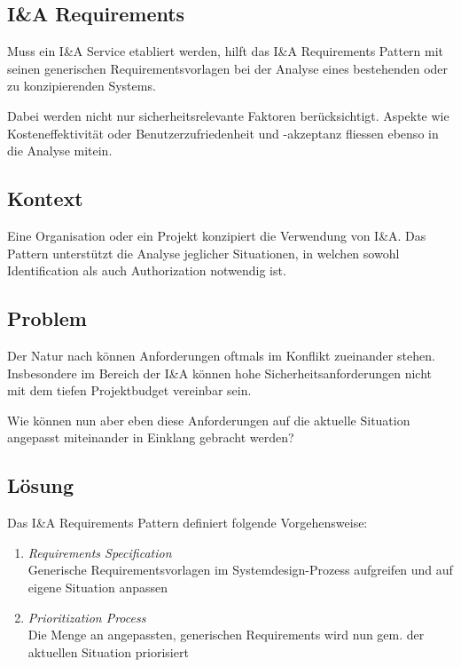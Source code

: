 \subsection{I\&A Requirements}
\label{sec:ianda-requriements}

Muss ein I\&A Service etabliert werden, hilft das I\&A Requirements Pattern mit seinen generischen Requirementsvorlagen bei der Analyse eines bestehenden oder zu konzipierenden Systems.

Dabei werden nicht nur sicherheitsrelevante Faktoren berücksichtigt. Aspekte wie Kosteneffektivität oder Benutzerzufriedenheit und -akzeptanz fliessen ebenso in die Analyse mitein.

\subsection*{Kontext}
Eine Organisation oder ein Projekt konzipiert die Verwendung von I\&A. Das Pattern unterstützt die Analyse jeglicher Situationen, in welchen sowohl Identification als auch Authorization notwendig ist.

\subsection*{Problem}
Der Natur nach können Anforderungen oftmals im Konflikt zueinander stehen. Insbesondere im Bereich der I\&A können hohe Sicherheitsanforderungen nicht mit dem tiefen Projektbudget vereinbar sein.

Wie können nun aber eben diese Anforderungen auf die aktuelle Situation angepasst miteinander in Einklang gebracht werden?

\subsection*{Lösung}
Das I\&A Requirements Pattern definiert folgende Vorgehensweise:

\begin{enumerate}
	\item \emph{Requirements Specification}\\
	Generische Requirementsvorlagen im Systemdesign-Prozess aufgreifen und auf eigene Situation anpassen
	\item \emph{Prioritization Process}\\
	Die Menge an angepassten, generischen Requirements wird nun gem. der aktuellen Situation priorisiert
\end{enumerate}

